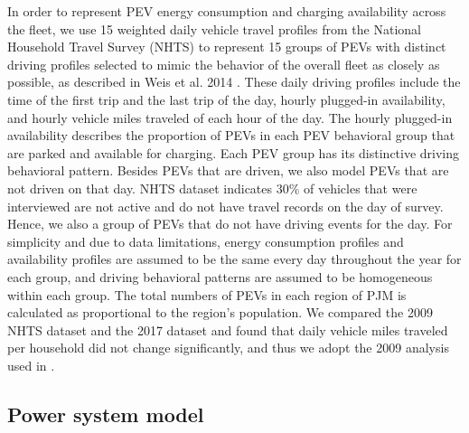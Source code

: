 \documentclass[9pt,twocolumn,twoside,lineno]{pnas-new}
\begin{document}
{In order to represent PEV energy consumption and charging availability across the fleet, we use 15 weighted daily vehicle travel profiles from the National Household Travel Survey (NHTS) to represent 15 groups of PEVs with distinct driving profiles selected to mimic the behavior of the overall fleet as closely as possible, as described in Weis et al. 2014 \cite{weis_estimating_2014}. These daily driving profiles include the time of the first trip and the last trip of the day, hourly plugged-in availability, and hourly vehicle miles traveled of each hour of the day. The hourly plugged-in availability describes the proportion of PEVs in each PEV behavioral group that are parked and available for charging. Each PEV group has its distinctive driving behavioral pattern. Besides PEVs that are driven, we also model PEVs that are not driven on that day. NHTS dataset indicates 30\% of vehicles that were interviewed are not active and do not have travel records on the day of survey. Hence, we also a group of PEVs that do not have driving events for the day. For simplicity and due to data limitations, energy consumption profiles and availability profiles are assumed to be the same every day throughout the year for each group, and driving behavioral patterns are assumed to be homogeneous within each group. The total numbers of PEVs in each region of PJM is calculated as proportional to the region's population. %
We compared the 2009 NHTS dataset and the 2017 dataset and found that daily vehicle miles traveled per household did not change significantly, and thus we adopt the 2009 analysis used in \cite{weis_estimating_2014}.

\subsection{Power system model}\label{gridmodeling}

}
\end{document}
